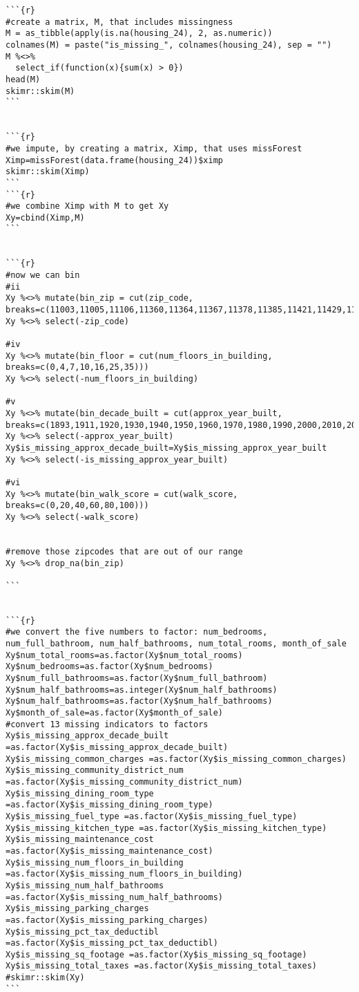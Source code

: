 \documentclass{article}
\begin{document}
\begin{lstlisting}
```{r}
#create a matrix, M, that includes missingness
M = as_tibble(apply(is.na(housing_24), 2, as.numeric))
colnames(M) = paste("is_missing_", colnames(housing_24), sep = "")
M %<>% 
  select_if(function(x){sum(x) > 0})
head(M)
skimr::skim(M)
```


```{r}
#we impute, by creating a matrix, Ximp, that uses missForest
Ximp=missForest(data.frame(housing_24))$ximp
skimr::skim(Ximp)
```
```{r}
#we combine Ximp with M to get Xy
Xy=cbind(Ximp,M)
```


```{r}
#now we can bin
#ii
Xy %<>% mutate(bin_zip = cut(zip_code, breaks=c(11003,11005,11106,11360,11364,11367,11378,11385,11421,11429,11436)))
Xy %<>% select(-zip_code)

#iv
Xy %<>% mutate(bin_floor = cut(num_floors_in_building, breaks=c(0,4,7,10,16,25,35)))
Xy %<>% select(-num_floors_in_building)

#v
Xy %<>% mutate(bin_decade_built = cut(approx_year_built, breaks=c(1893,1911,1920,1930,1940,1950,1960,1970,1980,1990,2000,2010,2020)))
Xy %<>% select(-approx_year_built)
Xy$is_missing_approx_decade_built=Xy$is_missing_approx_year_built
Xy %<>% select(-is_missing_approx_year_built)

#vi
Xy %<>% mutate(bin_walk_score = cut(walk_score, breaks=c(0,20,40,60,80,100)))
Xy %<>% select(-walk_score)


#remove those zipcodes that are out of our range
Xy %<>% drop_na(bin_zip)

```


```{r}
#we convert the five numbers to factor: num_bedrooms, num_full_bathroom, num_half_bathrooms, num_total_rooms, month_of_sale
Xy$num_total_rooms=as.factor(Xy$num_total_rooms)
Xy$num_bedrooms=as.factor(Xy$num_bedrooms)
Xy$num_full_bathrooms=as.factor(Xy$num_full_bathroom)
Xy$num_half_bathrooms=as.integer(Xy$num_half_bathrooms)
Xy$num_half_bathrooms=as.factor(Xy$num_half_bathrooms)
Xy$month_of_sale=as.factor(Xy$month_of_sale)
#convert 13 missing indicators to factors
Xy$is_missing_approx_decade_built =as.factor(Xy$is_missing_approx_decade_built)
Xy$is_missing_common_charges =as.factor(Xy$is_missing_common_charges)
Xy$is_missing_community_district_num =as.factor(Xy$is_missing_community_district_num)
Xy$is_missing_dining_room_type =as.factor(Xy$is_missing_dining_room_type)
Xy$is_missing_fuel_type =as.factor(Xy$is_missing_fuel_type)
Xy$is_missing_kitchen_type =as.factor(Xy$is_missing_kitchen_type)
Xy$is_missing_maintenance_cost =as.factor(Xy$is_missing_maintenance_cost)
Xy$is_missing_num_floors_in_building =as.factor(Xy$is_missing_num_floors_in_building)
Xy$is_missing_num_half_bathrooms =as.factor(Xy$is_missing_num_half_bathrooms)
Xy$is_missing_parking_charges =as.factor(Xy$is_missing_parking_charges)
Xy$is_missing_pct_tax_deductibl =as.factor(Xy$is_missing_pct_tax_deductibl)
Xy$is_missing_sq_footage =as.factor(Xy$is_missing_sq_footage)
Xy$is_missing_total_taxes =as.factor(Xy$is_missing_total_taxes)
#skimr::skim(Xy)
```


\end{lstlisting}
\end{document}
